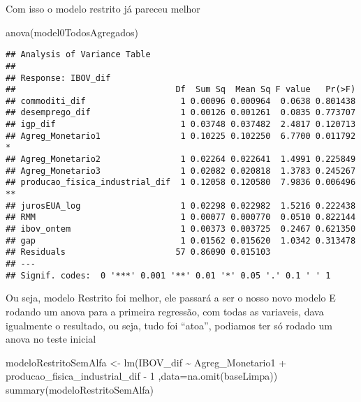 \documentclass[
]{article}
\newenvironment{Shaded}{\begin{snugshade}}{\end{snugshade}}
\newcommand{\AttributeTok}[1]{\textcolor[rgb]{0.77,0.63,0.00}{#1}}
\newcommand{\DecValTok}[1]{\textcolor[rgb]{0.00,0.00,0.81}{#1}}
\newcommand{\FunctionTok}[1]{\textcolor[rgb]{0.00,0.00,0.00}{#1}}
\newcommand{\NormalTok}[1]{#1}
\newcommand{\OtherTok}[1]{\textcolor[rgb]{0.56,0.35,0.01}{#1}}
\newcommand{\SpecialCharTok}[1]{\textcolor[rgb]{0.00,0.00,0.00}{#1}}
\begin{document}
Com isso o modelo restrito já pareceu melhor

\begin{Shaded}
\begin{Highlighting}[]
\FunctionTok{anova}\NormalTok{(model0TodosAgregados)}
\end{Highlighting}
\end{Shaded}

\begin{verbatim}
## Analysis of Variance Table
## 
## Response: IBOV_dif
##                                Df  Sum Sq  Mean Sq F value   Pr(>F)   
## commoditi_dif                   1 0.00096 0.000964  0.0638 0.801438   
## desemprego_dif                  1 0.00126 0.001261  0.0835 0.773707   
## igp_dif                         1 0.03748 0.037482  2.4817 0.120713   
## Agreg_Monetario1                1 0.10225 0.102250  6.7700 0.011792 * 
## Agreg_Monetario2                1 0.02264 0.022641  1.4991 0.225849   
## Agreg_Monetario3                1 0.02082 0.020818  1.3783 0.245267   
## producao_fisica_industrial_dif  1 0.12058 0.120580  7.9836 0.006496 **
## jurosEUA_log                    1 0.02298 0.022982  1.5216 0.222438   
## RMM                             1 0.00077 0.000770  0.0510 0.822144   
## ibov_ontem                      1 0.00373 0.003725  0.2467 0.621350   
## gap                             1 0.01562 0.015620  1.0342 0.313478   
## Residuals                      57 0.86090 0.015103                    
## ---
## Signif. codes:  0 '***' 0.001 '**' 0.01 '*' 0.05 '.' 0.1 ' ' 1
\end{verbatim}

Ou seja, modelo Restrito foi melhor, ele passará a ser o nosso novo
modelo E rodando um anova para a primeira regressão, com todas as
variaveis, dava igualmente o resultado, ou seja, tudo foi ``atoa'',
podiamos ter só rodado um anova no teste inicial

\begin{Shaded}
\begin{Highlighting}[]
\NormalTok{modeloRestritoSemAlfa }\OtherTok{\textless{}{-}} \FunctionTok{lm}\NormalTok{(IBOV\_dif }\SpecialCharTok{\textasciitilde{}}\NormalTok{ Agreg\_Monetario1 }\SpecialCharTok{+}\NormalTok{ producao\_fisica\_industrial\_dif }\SpecialCharTok{{-}} \DecValTok{1}\NormalTok{ ,}\AttributeTok{data=}\FunctionTok{na.omit}\NormalTok{(baseLimpa))}
\FunctionTok{summary}\NormalTok{(modeloRestritoSemAlfa)}
\end{Highlighting}
\end{Shaded}
\end{document}
